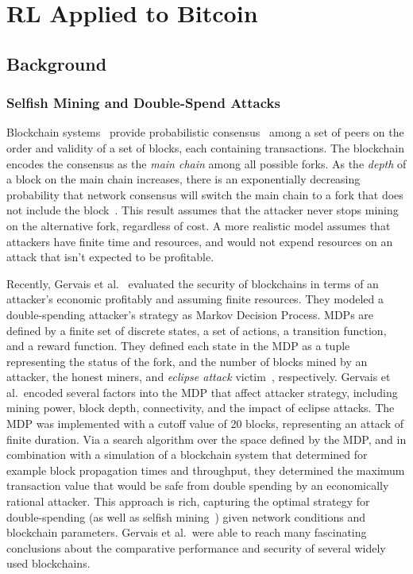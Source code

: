 \chapter{RL Applied to Bitcoin}\label{selfishRL}

\section{Background}

\subsection{Selfish Mining and Double-Spend Attacks}
Blockchain systems~\cite{Nakamoto:2009} provide probabilistic consensus~\cite{Vukolic:2015} among a set of peers on the order and validity of a set of blocks, each containing transactions. The blockchain encodes the consensus as the {\em main chain} among all possible forks. 
As the {\em depth} of a block on the main chain increases, there is an exponentially decreasing probability that network consensus will switch the main chain to a fork that does not include the block~\cite{Nakamoto:2009,Feller:1968}. This result assumes that the attacker never stops mining on the alternative fork, regardless of cost.  A more realistic model assumes that attackers have finite  time and resources, and would not expend resources on an attack that isn't expected to be profitable. 

Recently, Gervais et al.~\cite{Gervais:2016} evaluated the security of blockchains in terms of an attacker's economic profitably and assuming finite resources. They modeled a double-spending attacker's strategy  as Markov Decision Process. MDPs are defined by a finite set of discrete states, a set of actions, a transition function, and a reward function. They defined each  state in the MDP as a tuple representing the status of the fork, and the number of blocks mined by an attacker, the honest miners,  and {\em eclipse attack} victim~\cite{Heilman:2015}, respectively.   Gervais et al.\ encoded several factors into the MDP that affect  attacker strategy, including mining power, block depth, connectivity, and the impact of eclipse attacks. The MDP was implemented with a cutoff value of 20 blocks, representing an attack of finite duration. Via a search algorithm over the space defined by the MDP, and in combination with a simulation of a blockchain system that determined for example block propagation times and throughput, they determined the maximum transaction value that would be safe from double spending by an economically rational attacker. This  approach is rich, capturing the optimal strategy for  double-spending (as well as selfish mining~\cite{eyal:2014,sapirshtein:2015}) given  network conditions and blockchain parameters.  Gervais et al.\ were able to reach many fascinating conclusions  about the comparative performance and security of several widely used blockchains.

